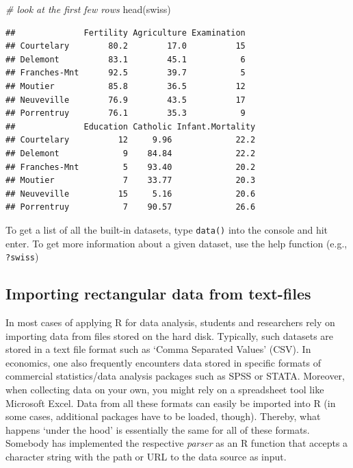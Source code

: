 \documentclass[
  12pt,
]{style/krantz}
\newenvironment{Shaded}{\begin{snugshade}}{\end{snugshade}}
\newcommand{\CommentTok}[1]{\textcolor[rgb]{0.56,0.35,0.01}{\textit{#1}}}
\newcommand{\FunctionTok}[1]{\textcolor[rgb]{0.00,0.00,0.00}{#1}}
\newcommand{\NormalTok}[1]{#1}
\begin{document}
\begin{Shaded}
\begin{Highlighting}[]
\CommentTok{\# look at the first few rows}
\FunctionTok{head}\NormalTok{(swiss)}
\end{Highlighting}
\end{Shaded}

\begin{verbatim}
##              Fertility Agriculture Examination
## Courtelary        80.2        17.0          15
## Delemont          83.1        45.1           6
## Franches-Mnt      92.5        39.7           5
## Moutier           85.8        36.5          12
## Neuveville        76.9        43.5          17
## Porrentruy        76.1        35.3           9
##              Education Catholic Infant.Mortality
## Courtelary          12     9.96             22.2
## Delemont             9    84.84             22.2
## Franches-Mnt         5    93.40             20.2
## Moutier              7    33.77             20.3
## Neuveville          15     5.16             20.6
## Porrentruy           7    90.57             26.6
\end{verbatim}

To get a list of all the built-in datasets, type \texttt{data()} into the console and hit enter. To get more information about a given dataset, use the help function (e.g., \texttt{?swiss})

\hypertarget{importing-rectangular-data-from-text-files}{%
\subsection{Importing rectangular data from text-files}\label{importing-rectangular-data-from-text-files}}

In most cases of applying R for data analysis, students and researchers rely on importing data from files stored on the hard disk. Typically, such datasets are stored in a text file format such as `Comma Separated Values' (CSV). In economics, one also frequently encounters data stored in specific formats of commercial statistics/data analysis packages such as SPSS or STATA. Moreover, when collecting data on your own, you might rely on a spreadsheet tool like Microsoft Excel. Data from all these formats can easily be imported into R (in some cases, additional packages have to be loaded, though). Thereby, what happens `under the hood' is essentially the same for all of these formats. Somebody has implemented the respective \emph{parser} as an R function that accepts a character string with the path or URL to the data source as input.
\end{document}
